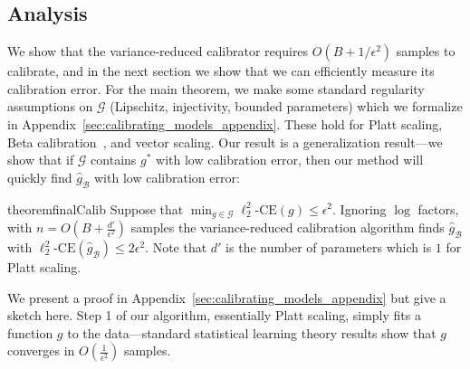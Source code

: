 

\subsection{Analysis}

We  show that the variance-reduced calibrator requires $O(B + 1/\epsilon^2)$ samples to calibrate, and in the next section  we show that we can efficiently measure its calibration error. For the main theorem, we make some standard regularity assumptions on $\mathcal{G}$ (Lipschitz, injectivity, bounded parameters) which we formalize in Appendix~\ref{sec:calibrating_models_appendix}. These hold for Platt scaling, Beta calibration~\cite{kull2017sigmoids}, and vector scaling. Our result is a generalization result---we show that if $\mathcal{G}$ contains  $g^*$ with low calibration error, then our method will quickly find $\hat{g}_{\mathcal{B}}$ with low calibration error:

\begin{restatable}{theorem}{finalCalib}
\label{thm:final-calib}
Suppose that $\min_{g \in \mathcal{G}}\ell_2^2\mbox{-CE}(g) \leq \epsilon^2$.
  Ignoring $\log$ factors, with $n = O(B + \frac{d'}{\epsilon^2})$ samples\pl{,} the variance-reduced calibration algorithm  finds $\hat{g}_{\mathcal{B}}$ with $\ell_2^2\mbox{-CE}(\hat{g}_{\mathcal{B}}) \leq 2 \epsilon^2$. Note that $d'$ is the number of parameters which is $1$ for Platt scaling.
\end{restatable}

We present a proof in Appendix~\ref{sec:calibrating_models_appendix} but give a sketch here. Step 1 of our algorithm, essentially  Platt scaling, simply fits a function $g$ to the data---standard statistical learning theory results show that $g$ converges in $O(\frac{1}{\epsilon^2})$ samples.


